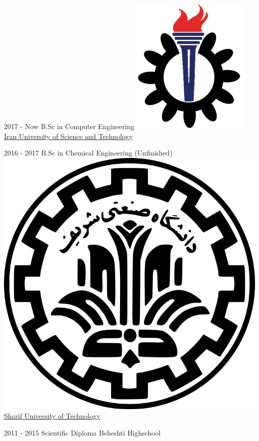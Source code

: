\documentclass[a4paper]{./classes/friggeri-cv}
\begin{document}
    \begin{entrylist}
        \entry
        {2017 - Now}
        {     B.Sc in Computer Engineering}
        {\href{http://www.iust.ac.ir/}{\includegraphics[scale=0.08]{../assets/images/logos/IUST_logo_color.png}Iran University of Science and Technology}}
        {}

        \entry
        {2016 - 2017}
        {    B.Sc in Chemical Engineering (Unfinished)}
        {\href{http://www.sharif.ir/}{\includegraphics[scale=0.015]{../assets/images/logos/Sharif_logo.png} Sharif University of Technology}}
        {}

        \entry
        {2011 - 2015}
        {    Scientific Diploma}
        {Beheshti Highschool}
        {}
    \end{entrylist}
\end{document}

